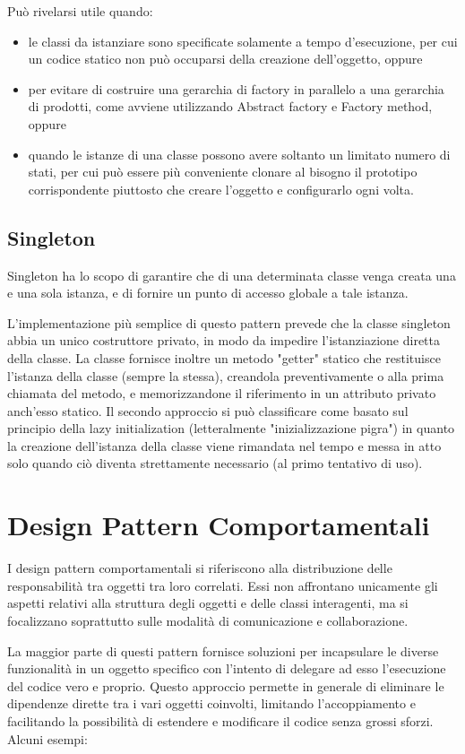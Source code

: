 Può rivelarsi utile quando:
\begin{itemize}
\item le classi da istanziare sono specificate solamente a tempo d'esecuzione, per cui un codice statico non può occuparsi della creazione dell'oggetto, oppure
\item per evitare di costruire una gerarchia di factory in parallelo a una gerarchia di prodotti, come avviene utilizzando Abstract factory e Factory method, oppure
\item quando le istanze di una classe possono avere soltanto un limitato numero di stati, per cui può essere più conveniente clonare al bisogno il prototipo corrispondente piuttosto che creare l'oggetto e configurarlo ogni volta.
\end{itemize}
\subsection{Singleton}
Singleton ha lo scopo di garantire che di una determinata classe venga creata una e una sola istanza, e di fornire un punto di accesso globale a tale istanza.

L'implementazione più semplice di questo pattern prevede che la classe singleton abbia un unico costruttore privato, in modo da impedire l'istanziazione diretta della classe. La classe fornisce inoltre un metodo "getter" statico che restituisce l'istanza della classe (sempre la stessa), creandola preventivamente o alla prima chiamata del metodo, e memorizzandone il riferimento in un attributo privato anch'esso statico. Il secondo approccio si può classificare come basato sul principio della lazy initialization (letteralmente "inizializzazione pigra") in quanto la creazione dell'istanza della classe viene rimandata nel tempo e messa in atto solo quando ciò diventa strettamente necessario (al primo tentativo di uso).

\section{Design Pattern Comportamentali}
I design pattern comportamentali si riferiscono alla distribuzione delle responsabilità tra oggetti tra loro correlati. Essi non affrontano unicamente gli aspetti relativi alla struttura degli oggetti e delle classi interagenti, ma si focalizzano soprattutto sulle modalità di comunicazione e collaborazione.

La maggior parte di questi pattern fornisce soluzioni per incapsulare le diverse funzionalità in un oggetto specifico con l’intento di delegare ad esso l’esecuzione del codice vero e proprio. Questo approccio permette in generale di eliminare le dipendenze dirette tra i vari oggetti coinvolti, limitando l’accoppiamento e facilitando la possibilità di estendere e modificare il codice senza grossi sforzi.
Alcuni esempi:
